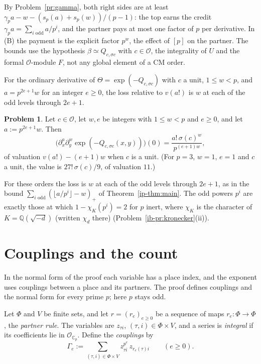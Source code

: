 \documentclass[reqno]{amsart}
\theoremstyle{definition}
\newtheorem{problem}{Problem}[section]
\theoremstyle{plain}
\newcommand{\Q}{\mathbb{Q}}
\newcommand{\Oc}{\mathcal{O}}
\newcommand{\C}{\mathbb{C}}
\newcommand{\Op}{\mathcal{O}_{\C_p}}
\begin{document}
By Problem~\ref{pr:gamma}, both right sides are at least \(\gamma_p a - w - (s_p(a) + s_p(w))/(p-1)\): the top earns the credit \(\gamma_p a = \sum_{i \text{ odd}} a/p^i\), and the partner pays at most one factor of \(p\) per derivative.  In (B) the payment is the explicit factor \(p^w\), the effect of \([p]\) on the partner.  The bounds use the hypothesis \(\beta \simeq Q_{c,\sigma c}\) with \(c \in \Oc\), the integrality of \(U\) and the formal \(\Oc\)-module \(F\), not any global element of a CM order.

For the ordinary derivative of \(\Theta=\exp(-Q_{c,\sigma c})\) with \(c\) a unit, \(1\le w<p\), and \(a=p^{2e+1}w\) for an integer \(e\ge0\), the loss relative to \(v(a!)\) is \(w\) at each of the odd levels through \(2e+1\).

\begin{problem}\label{pr:mixed}
Let \(c \in \Oc\), let \(w, e\) be integers with \(1 \le w < p\) and \(e \ge 0\), and let \(a := p^{2e+1} w\).  Then
\[
  \bigl(\partial_x^a \partial_y^w \exp(-Q_{c,\sigma c}(x,y))\bigr)(0) = \frac{a!\, \sigma(c)^w}{p^{(e+1)w}} ,
\]
of valuation \(v(a!) - (e+1)w\) when \(c\) is a unit.  (For \(p = 3\), \(w = 1\), \(e = 1\) and \(c\) a unit, the value is \(27!\,\sigma(c)/9\), of valuation \(11\).)
\end{problem}

For these orders the loss is \(w\) at each of the odd levels through \(2e+1\), as in the bound \(\sum_{i \text{ odd}} (\lfloor a/p^i \rfloor - w)_+\) of Theorem~\ref{ip-thm:main}.  The odd powers \(p^i\) are exactly those at which \(1 - \chi_K(p^i) = 2\) for \(p\) inert, where \(\chi_K\) is the character of \(K = \Q(\sqrt{-d})\) (written \(\chi_d\) there) (Problem~\ref{ib-pr:kronecker}(ii)).

\section{Couplings and the count}\label{sec:count}

In the normal form of the proof \cite{GL} each variable has a place index, and the exponent uses couplings between a place and its partners.  The proof defines couplings and the normal form for every prime \(p\); here \(p\) stays odd.

Let \(\Phi\) and \(V\) be finite sets, and let \(r = (r_e)_{e \ge 0}\) be a sequence of maps \(r_e \colon \Phi \to \Phi\), the \emph{partner rule}.  The variables are \(z_{\tau i}\), \((\tau, i) \in \Phi \times V\), and a series is \emph{integral} if its coefficients lie in \(\Op\).  Define the \emph{couplings} by
\[
  \Gamma_e := \sum_{(\tau, i) \in \Phi \times V} z_{\tau i}^{p^e}\, z_{r_e(\tau) i} \qquad (e \ge 0).
\]
\end{document}
